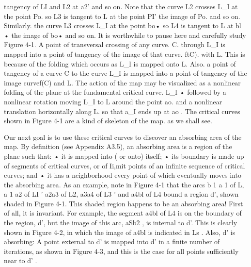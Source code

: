\documentclass{article}
\begin{document}
tangency of LI and L2 at a2' and so on. Note that the curve L2
crosses L_I at the point Po. so L3 is tangent to L at the point PI'
the image of Po. and so on. Similarly. the curve L3 crosses L_I at
the point bo• so L4 is tangent to L at bl • the image of bo• and so
on.
It is worthwhile to pause here and carefully study Figure 4-1. A
point of transversal crossing of any curve. C. through L_I is
mapped into a point of tangency of the image of that curve. ftC).
with L. This is because of the folding which occurs as L_I is
mapped onto L. Also. a point of tangency of a curve C to the curve
L_I is mapped into a point of tangency of the image curvef(C) and
L.
The action of the map may be visualized as a nonlinear folding
of the plane at the fundamental critical curve. L_I • followed by a
nonlinear rotation moving L_I to L around the point ao. and a nonlinear
translation horizontally along L. so that a_I ends up at ao .
The critical curves shown in Figure 4-1 are a kind of skeleton of the
map. as we shall see.

Our next goal is to use these critical curves to discover an
absorbing area of the map. By definition (see Appendix A3.5), an
absorbing area is a region of the plane such that:
• it is mapped into ( or onto) itself;
• its boundary is made up of segments of critical curves, or of
Ii,mit points of an infinite sequence of critical curves; and
• it has a neighborhood every point of which eventually
moves into the absorbing area.
As an example, note in Figure 4-1 that the arcs b 1 a 1 of L, a 1 a2
of LI ' a2a3 of L2, a3a4 of L3 ' and a4bl of L4 bound a region d',
shown shaded in Figure 4-1. This shaded region happens to be an
absorbing area! First of all, it is invariant. For example, the segment
a4bl of L4 is on the boundary of the region, d', but the image of
this arc, aSb2 , is internal to d'. This is clearly shown in Figure 4-2,
in which the image of a4bl is indicated in Ls .
Also, d' is absorbing: A point external to d' is mapped into d'
in a finite number of iterations, as shown in Figure 4-3, and this is
the case for all points sufficiently near to d' .
\end{document}
